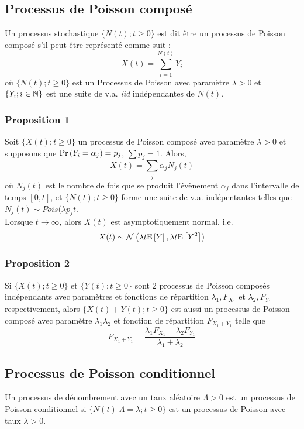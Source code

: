 \documentclass[10pt, french, landscape]{article}
\begin{document}
\begin{multicols*}{3}
\subsection*{Processus de Poisson composé}
\begin{definition}[Définition]
Un processus stochastique $\{ N(t) ; t \geq 0  \}$ est dit être un processus de Poisson composé s'il peut être représenté comme suit : 
\[X(t) = \sum_{i=1}^{N(t)} Y_i\]
où $\{ N(t) ; t \geq 0  \}$ est un Processus de Poisson avec paramètre $\lambda > 0$ et $\{ Y_i ; i \in \mathbb{N} \}$ est une suite de v.a. \emph{iid} indépendantes de $N(t)$.
\end{definition}

\subsubsection*{Proposition 1}
Soit $\{ X(t) ; t \geq 0 \}$ un processus de Poisson composé avec paramètre $\lambda > 0$ et supposons que $\Pr \left( Y_i = \alpha_j \right) = p_j$, $\sum p_j = 1$. Alors,
\[X(t) = \sum_j \alpha_j N_j(t) \]
où $N_j(t)$ est le nombre de fois que se produit l'évènement $\alpha_j$ dans l'intervalle de temps $[0,t]$, et $\{N(t) ; t \geq 0  \}$ forme une suite de v.a. indépentantes telles que $N_j(t) \sim Pois(\lambda p_j t$. \\
Lorsque $t \to \infty$, alors $X(t)$ est asymptotiquement normal, i.e.
\[X(t) \sim \mathcal{N}\left( \lambda t \mathrm{E} \left[ Y \right], \lambda t \mathrm{E} \left[ Y^2 \right] \right)\]

\subsubsection*{Proposition 2}
Si $\{ X(t) ; t \geq 0 \}$ et $\{ Y(t) ; t \geq 0 \}$ sont 2 processus de Poisson composés indépendants avec paramètres et fonctions de répartition $\lambda_1, F_{X_1}$ et $\lambda_2, F_{Y_1}$ respectivement, alors $\{ X(t) + Y(t) ; t \geq 0 \}$ est aussi un processus de Poisson composé avec paramètre $\lambda_1  \lambda_2$ et fonction de répartition $F_{X_1 + Y_1}$ telle que
\[F_{X_1 + Y_1} = \frac{\lambda_1 F_{X_1} + \lambda_2 F_{Y_1}}{\lambda_1 + \lambda_2}  \]


\columnbreak %
\subsection*{Processus de Poisson conditionnel}
\begin{definition}[Définition]
Un processus de dénombrement avec un taux aléatoire $\Lambda > 0$ est un processus de Poisson conditionnel si $\{ N(t) | \Lambda = \lambda ; t \geq 0 \}$ est un processus de Poisson avec taux $\lambda > 0$.
\end{definition}


\end{multicols*}
\end{document}
